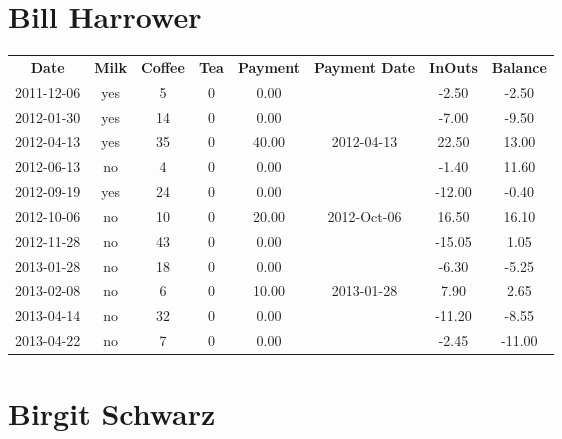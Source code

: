 \section{Bill Harrower}

\begin{center}
\begin{tabular}{cccccccc}
\textbf{Date} & \textbf{Milk} & \textbf{Coffee} & \textbf{Tea} & \textbf{Payment} & \textbf{Payment Date} & \textbf{InOuts} & \textbf{Balance} \\
2011-12-06 & yes &  5 & 0 &  0.00 &  &  -2.50 &  -2.50\\ 
2012-01-30 & yes & 14 & 0 &  0.00 &  &  -7.00 &  -9.50\\ 
2012-04-13 & yes & 35 & 0 & 40.00 & 2012-04-13 &  22.50 &  13.00\\ 
2012-06-13 & no &  4 & 0 &  0.00 &  &  -1.40 &  11.60\\ 
2012-09-19 & yes & 24 & 0 &  0.00 &  & -12.00 &  -0.40\\ 
2012-10-06 & no & 10 & 0 & 20.00 & 2012-Oct-06 &  16.50 &  16.10\\ 
2012-11-28 & no & 43 & 0 &  0.00 &  & -15.05 &   1.05\\ 
2013-01-28 & no & 18 & 0 &  0.00 &  &  -6.30 &  -5.25\\ 
2013-02-08 & no &  6 & 0 & 10.00 & 2013-01-28 &   7.90 &   2.65\\ 
2013-04-14 & no & 32 & 0 &  0.00 &  & -11.20 &  -8.55\\ 
2013-04-22 & no &  7 & 0 &  0.00 &  &  -2.45 & -11.00
\end{tabular}
\end{center}

\section{Birgit Schwarz}

